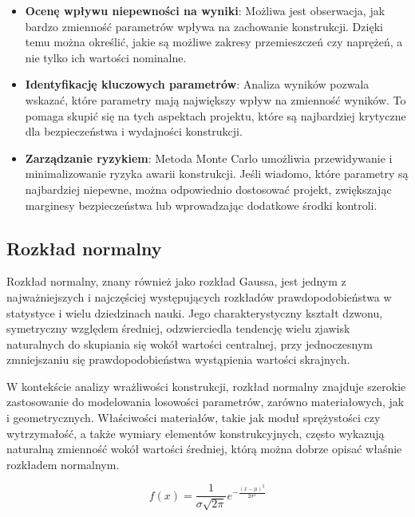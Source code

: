 \begin{itemize}
    \item \textbf{Ocenę wpływu niepewności na wyniki}: Możliwa jest obserwacja, jak bardzo zmienność parametrów wpływa na zachowanie konstrukcji. Dzięki temu można określić, jakie są możliwe zakresy przemieszczeń czy naprężeń, a nie tylko ich wartości nominalne.
    \item \textbf{Identyfikację kluczowych parametrów}: Analiza wyników pozwala wskazać, które parametry mają największy wpływ na zmienność wyników. To pomaga skupić się na tych aspektach projektu, które są najbardziej krytyczne dla bezpieczeństwa i wydajności konstrukcji.
    \item \textbf{Zarządzanie ryzykiem}: Metoda Monte Carlo umożliwia przewidywanie i minimalizowanie ryzyka awarii konstrukcji. Jeśli wiadomo, które parametry są najbardziej niepewne, można odpowiednio dostosować projekt, zwiększając marginesy bezpieczeństwa lub wprowadzając dodatkowe środki kontroli.
\end{itemize}

\subsection{Rozkład normalny}

Rozkład normalny, znany również jako rozkład Gaussa, jest jednym z najważniejszych i najczęściej występujących rozkładów prawdopodobieństwa w statystyce i wielu dziedzinach nauki.
Jego charakterystyczny kształt dzwonu, symetryczny względem średniej, odzwierciedla tendencję wielu zjawisk naturalnych do skupiania się wokół wartości centralnej, przy jednoczesnym zmniejszaniu się prawdopodobieństwa wystąpienia wartości skrajnych.

W kontekście analizy wrażliwości konstrukcji, rozkład normalny znajduje szerokie zastosowanie do modelowania losowości parametrów, zarówno materiałowych, jak i geometrycznych.
Właściwości materiałów, takie jak moduł sprężystości czy wytrzymałość, a także wymiary elementów konstrukcyjnych, często wykazują naturalną zmienność wokół wartości średniej, którą można dobrze opisać właśnie rozkładem normalnym.

\begin{equation}
    f(x) = \frac{1}{\sigma \sqrt{2\pi}} e^{-\frac{(x - \mu)^2}{2\sigma^2}}\label{eq:gauss}
\end{equation}

